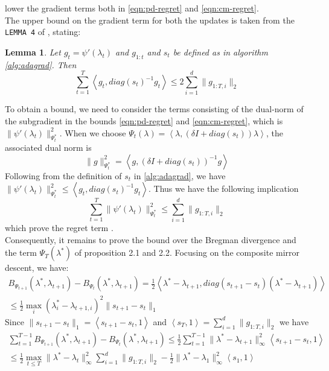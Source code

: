 \documentclass[notitlepage]{article}
\newcommand*\circled[1]{\tikz[baseline=(char.base)]{\node[shape=circle,draw,inner sep=2pt] (char) {#1};}}
\newtheorem{lemma}{Lemma}[section]
\begin{document}
lower the gradient terms both in \eqref{eqn:pd-regret} and \eqref{eqn:cm-regret}.\\
The upper bound on the gradient term for both the updates is taken from the \texttt{LEMMA 4} of \cite{JMLR:v12:duchi11a}, stating:
\begin{lemma}
  Let $g_t = \psi'(\lambda_t)$ and $g_{1:t}$ and $s_t$ be defined as in algorithm \ref{alg:adagrad}. Then 
  \[ \sum_{t=1}^T \left\langle g_t,diag(s_t)^{-1}g_t \right\rangle \le 2 \sum_{i=1}^d \|g_{1:T,i}\|_2 \]
\end{lemma}
To obtain a bound, we need to consider the terms consisting of the dual-norm of the subgradient in the bounds \eqref{eqn:pd-regret} and \eqref{eqn:cm-regret}, which is $\|\psi'(\lambda_t)\|_{\Psi_t^*}^2$. When we choose $\Psi_t(\lambda) = \left\langle \lambda,(\delta I + diag(s_t)) \lambda \right\rangle$, the associated dual norm is
\[ \| g \|_{\Psi_t^*}^2 = \left\langle g,(\delta I + diag(s_t))^{-1} g \right\rangle\]
Following from the definition of $s_t$ in \ref{alg:adagrad}, we have $\|\psi'(\lambda_t)\|_{\Psi_t^*}^2 \le \left\langle g_t, diag(s_t)^{-1} g_t \right\rangle$. Thus we have the following implication
\[ \sum_{t=1}^T \|\psi'(\lambda_t)\|_{\Psi_t^*}^2 \le \sum_{i=1}^d \|g_{1:T,i}\|_2 \]
which prove the regret term \circled{2}.\\
Consequently, it remains to prove the bound over the Bregman divergence and the term $\Psi_T(\lambda^*)$ of proposition 2.1 and 2.2. Focusing on the composite mirror descent, we have:
\begin{align*}
  B_{\Psi_{t+1}} (\lambda^*, \lambda_{t+1}) - B_{\Psi_{t}} (\lambda^*, \lambda_{t+1}) = \frac{1}{2} \left\langle \lambda^* - \lambda_{t+1}, diag(s_{t+1} - s_t)(\lambda^* - \lambda_{t+1}) \right\rangle \\
  \le \frac{1}{2} \max_i (\lambda_i^* - \lambda_{t+1,i})^2 \| s_{t+1} - s_t \|_1
\end{align*}
Since $\| s_{t+1} - s_t \|_1 = \left\langle s_{t+1} - s_t, 1 \right\rangle$ and $\left\langle s_T,1 \right\rangle = \sum_{i=1}^d \| g_{1:T,i} \|_2$ we have
\begin{align*}
  \sum_{t=1}^{T-1} B_{\Psi_{t+1}} (\lambda^*, \lambda_{t+1}) - B_{\Psi_{t}} (\lambda^*, \lambda_{t+1}) \le \frac{1}{2} \sum_{t=1}^{T-1} \| \lambda^* - \lambda_{t+1} \|_\infty^2 \left\langle s_{t+1} - s_t, 1 \right\rangle \\
  \le \frac{1}{2} \max_{t \le T} \|\lambda^* - \lambda_t\|_\infty^2 \sum_{i=1}^d \|g_{1:T,i}\|_2 - \frac{1}{2} \|\lambda^* - \lambda_1\|_\infty^2 \left\langle s_1,1 \right\rangle
\end{align*} 
\end{document}
